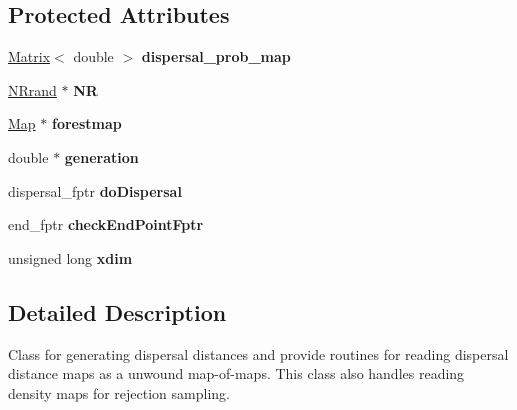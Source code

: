 \subsection*{Protected Attributes}
\begin{DoxyCompactItemize}
\item 
\hyperlink{class_matrix}{Matrix}$<$ double $>$ {\bfseries dispersal\+\_\+prob\+\_\+map}\hypertarget{class_dispersal_coordinator_a3d780624030ef3d6b3e2b5ae642854fe}{}\label{class_dispersal_coordinator_a3d780624030ef3d6b3e2b5ae642854fe}

\item 
\hyperlink{class_n_rrand}{N\+Rrand} $\ast$ {\bfseries NR}\hypertarget{class_dispersal_coordinator_ac4c17447257ed00e1b5610e0e35a5443}{}\label{class_dispersal_coordinator_ac4c17447257ed00e1b5610e0e35a5443}

\item 
\hyperlink{class_map}{Map} $\ast$ {\bfseries forestmap}\hypertarget{class_dispersal_coordinator_a0baab0b4fb86730da8b1adfcaa088b4c}{}\label{class_dispersal_coordinator_a0baab0b4fb86730da8b1adfcaa088b4c}

\item 
double $\ast$ {\bfseries generation}\hypertarget{class_dispersal_coordinator_ae3f83d100dad7c60137edf42b3c199c1}{}\label{class_dispersal_coordinator_ae3f83d100dad7c60137edf42b3c199c1}

\item 
dispersal\+\_\+fptr {\bfseries do\+Dispersal}\hypertarget{class_dispersal_coordinator_a93262d2bb612108bfcdc56c1ba11bad1}{}\label{class_dispersal_coordinator_a93262d2bb612108bfcdc56c1ba11bad1}

\item 
end\+\_\+fptr {\bfseries check\+End\+Point\+Fptr}\hypertarget{class_dispersal_coordinator_a1612005c176cd769797a4d4e459e2dec}{}\label{class_dispersal_coordinator_a1612005c176cd769797a4d4e459e2dec}

\item 
unsigned long {\bfseries xdim}\hypertarget{class_dispersal_coordinator_a66668e6ceec55afa61c1e99719bc6146}{}\label{class_dispersal_coordinator_a66668e6ceec55afa61c1e99719bc6146}

\end{DoxyCompactItemize}


\subsection{Detailed Description}
Class for generating dispersal distances and provide routines for reading dispersal distance maps as a unwound map-\/of-\/maps. This class also handles reading density maps for rejection sampling. 

